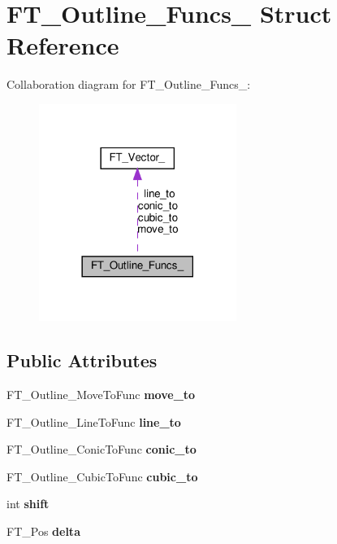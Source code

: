 \hypertarget{structFT__Outline__Funcs__}{}\section{F\+T\+\_\+\+Outline\+\_\+\+Funcs\+\_\+ Struct Reference}
\label{structFT__Outline__Funcs__}


Collaboration diagram for F\+T\+\_\+\+Outline\+\_\+\+Funcs\+\_\+\+:
\nopagebreak
\begin{figure}[H]
\begin{center}
\leavevmode
\includegraphics[width=182pt]{structFT__Outline__Funcs____coll__graph}
\end{center}
\end{figure}
\subsection*{Public Attributes}
\begin{DoxyCompactItemize}
\item 
\mbox{\label{structFT__Outline__Funcs___abd53463a59a1ae2c6998e619c2ab6a65}} 
F\+T\+\_\+\+Outline\+\_\+\+Move\+To\+Func {\bfseries move\+\_\+to}
\item 
\mbox{\label{structFT__Outline__Funcs___a876fc8ca7541786cd3c4ec3806f88360}} 
F\+T\+\_\+\+Outline\+\_\+\+Line\+To\+Func {\bfseries line\+\_\+to}
\item 
\mbox{\label{structFT__Outline__Funcs___a09681f5a64189066d3fba3cf398a135b}} 
F\+T\+\_\+\+Outline\+\_\+\+Conic\+To\+Func {\bfseries conic\+\_\+to}
\item 
\mbox{\label{structFT__Outline__Funcs___aa3e0c1bacb181a5f43c104ab7f72cfda}} 
F\+T\+\_\+\+Outline\+\_\+\+Cubic\+To\+Func {\bfseries cubic\+\_\+to}
\item 
\mbox{\label{structFT__Outline__Funcs___a540c246669b21b86cb405b3d9019cfda}} 
int {\bfseries shift}
\item 
\mbox{\label{structFT__Outline__Funcs___a3c3121398b3ff564b4f3fd5b2a318e5e}} 
F\+T\+\_\+\+Pos {\bfseries delta}
\end{DoxyCompactItemize}


